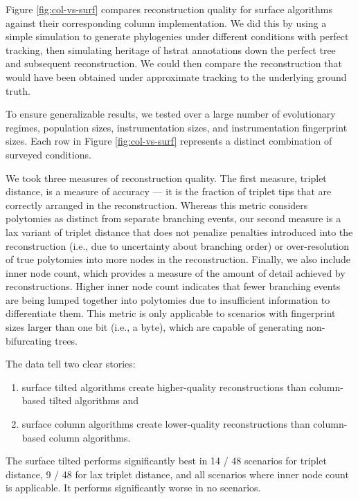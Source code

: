 

Figure \ref{fig:col-vs-surf} compares reconstruction quality for surface algorithms against their corresponding column implementation.
We did this by using a simple simulation to generate phylogenies under different conditions with perfect tracking, then simulating heritage of hstrat annotations down the perfect tree and subsequent reconstruction.
We could then compare the reconstruction that would have been obtained under approximate tracking to the underlying ground truth.

To ensure generalizable results, we tested over a large number of evolutionary regimes, population sizes, instrumentation sizes, and instrumentation fingerprint sizes.
Each row in Figure \ref{fig:col-vs-surf} represents a distinct combination of surveyed conditions.

We took three measures of reconstruction quality.
The first measure, triplet distance, is a measure of accuracy --- it is the fraction of triplet tips that are correctly arranged in the reconstruction.
Whereas this metric considers polytomies as distinct from separate branching events, our second measure is a lax variant of triplet distance that does not penalize penalties introduced into the reconstruction (i.e., due to uncertainty about branching order) or over-resolution of true polytomies into more nodes in the reconstruction.
Finally, we also include inner node count, which provides a measure of the amount of detail achieved by reconstructions.
Higher inner node count indicates that fewer branching events are being lumped together into polytomies due to insufficient information to differentiate them.
This metric is only applicable to scenarios with fingerprint sizes larger than one bit (i.e., a byte), which are capable of generating non-bifurcating trees.

The data tell two clear stories:
\begin{enumerate}
\item surface tilted algorithms create higher-quality reconstructions than column-based tilted algorithms and
\item surface column algorithms create lower-quality reconstructions than column-based column algorithms.
\end{enumerate}

The surface tilted performs significantly best in 14 / 48 scenarios for triplet distance, 9 / 48 for lax triplet distance, and all scenarios where inner node count is applicable.
It performs significantly worse in no scenarios.


